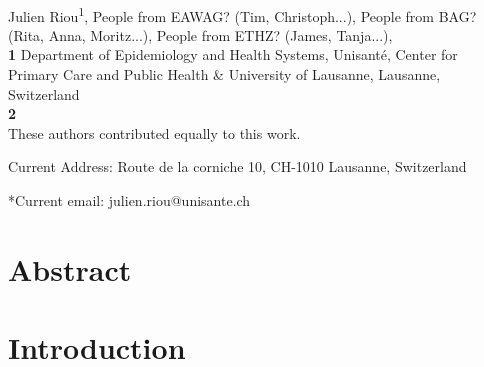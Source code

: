 \documentclass[10pt,letterpaper]{article}
\begin{document}
	\vspace*{0.2in}
	
	\begin{flushleft}
		{\Large
			\textbf{} 
		}
		\newline
		\\
		
		Julien Riou\textsuperscript{1\textcurrency*}, 
		People from EAWAG? (Tim, Christoph...),
		People from BAG? (Rita, Anna, Moritz...),
		People from ETHZ? (James, Tanja...),
		\\
		\bigskip
		\textbf{1} Department of Epidemiology and Health Systems, Unisanté, Center for Primary Care and Public Health \& University of Lausanne, Lausanne, Switzerland
		\\
		\textbf{2} 
		\\
		
		\bigskip
		\Yinyang These authors contributed equally to this work.
		
		\textcurrency Current Address: Route de la corniche 10, CH-1010 Lausanne, Switzerland
		
		*Current email: julien.riou@unisante.ch
		
	\end{flushleft}

\section*{Abstract}



\linenumbers

\section{Introduction}
\end{document}
